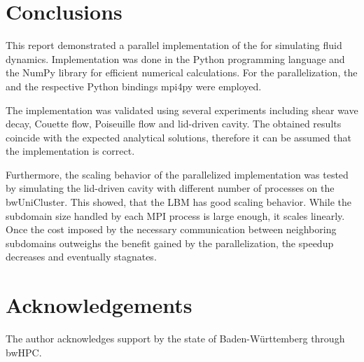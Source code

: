 \section{Conclusions}

This report demonstrated a parallel implementation of the  for simulating fluid dynamics. Implementation was done in the Python programming language and the NumPy library for efficient numerical calculations. For the parallelization, the  and the respective Python bindings mpi4py were employed.

The implementation was validated using several experiments including shear wave decay, Couette flow, Poiseuille flow and lid-driven cavity. The obtained results coincide with the expected analytical solutions, therefore it can be assumed that the implementation is correct.

Furthermore, the scaling behavior of the parallelized implementation was tested by simulating the lid-driven cavity with different number of processes on the bwUniCluster. This showed, that the \gls{LBM} has good scaling behavior. While the subdomain size handled by each MPI process is large enough, it scales linearly. Once the cost imposed by the necessary communication between neighboring subdomains outweighs the benefit gained by the parallelization, the speedup decreases and eventually stagnates.

\section*{Acknowledgements}

The author acknowledges support by the state of Baden-Württemberg through bwHPC.
